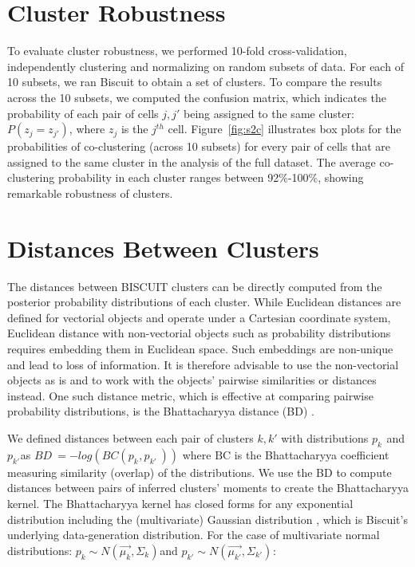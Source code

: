 \section{Cluster Robustness}

To evaluate cluster robustness, we performed 10-fold cross-validation, independently clustering and normalizing on random subsets of data.
For each of 10 subsets, we ran Biscuit to obtain a set of clusters.
To compare the results across the 10 subsets, we computed the confusion matrix, which indicates the probability of each pair of cells \(j,j'\) being assigned to the same cluster: \(P(z_{j} = z_{j'})\), where $z_j$ is the $j^{th}$ cell.
Figure~\ref{fig:s2c} illustrates box plots for the probabilities of co-clustering (across 10 subsets) for every pair of cells that are assigned to the same cluster in the analysis of the full dataset.
The average co-clustering probability in each cluster ranges between 92\%-100\%, showing remarkable robustness of clusters.

\section{Distances Between Clusters}

The distances between BISCUIT clusters can be directly computed from the posterior probability distributions of each cluster. 
While Euclidean distances are defined for vectorial objects and operate under a Cartesian coordinate system, Euclidean distance with non-vectorial objects such as probability distributions requires embedding them in Euclidean space.
Such embeddings are non-unique and lead to loss of information.
It is therefore advisable to use the non-vectorial objects as is and to work with the objects' pairwise similarities or distances instead.
One such distance metric, which is effective at comparing pairwise probability distributions, is the Bhattacharyya distance (BD) \citep{Bhattacharyya1990}.

We defined distances between each pair of clusters \(k,k'\) with distributions \({p_{k}}^{}\) and \({p_{k'}}^{}\)as \(BD\  = - log(BC({p_{k}}^{},{p_{k'}}^{\ }))\) where \(\text{BC}\) is the Bhattacharyya coefficient measuring similarity (overlap) of the distributions.
We use the BD to compute distances between pairs of inferred clusters' moments to create the Bhattacharyya kernel.
The Bhattacharyya kernel has closed forms for any exponential distribution including the (multivariate) Gaussian distribution \citep{Jebara2004}, which is Biscuit's underlying data-generation distribution.
For the case of multivariate normal distributions: \({p_{k} \sim N(\overrightarrow{\mu_{k}},\Sigma_{k})}^{}\)and \({p_{k'} \sim N(\overrightarrow{\mu_{k'}},\Sigma_{k'})}^{}\):

